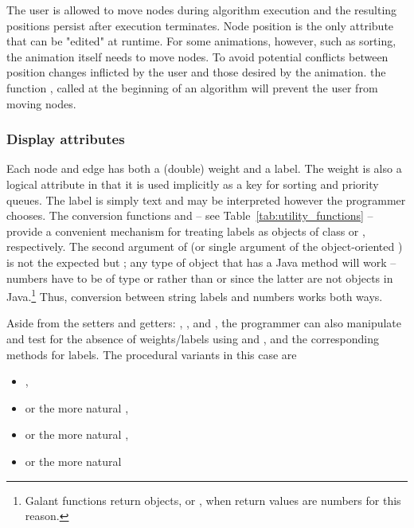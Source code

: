 The user is allowed to move nodes during algorithm execution
and the resulting positions persist after execution terminates.
Node position is the only attribute that can be "edited" at runtime.
For some animations, however, such as sorting,
the animation itself needs to move
nodes.
To avoid potential conflicts between position changes inflicted by the user
and those desired by the animation.
the function , called at the beginning of an algorithm
will prevent the user from moving nodes.

\subsubsection{Display attributes} \label{sec:display_attributes}

Each node and edge has
both a (double) weight and a label.
The weight
is also a logical
attribute in that
it is used implicitly as a
key for
sorting and priority queues.
The label is simply text and may be interpreted however the programmer
chooses.
The conversion functions 
and 
-- see Table~\ref{tab:utility_functions}
-- provide a convenient mechanism for treating labels as objects of class
 or , respectively.
The second argument of  (or single argument of the
object-oriented )
is not the expected 
but ;
any type of object that has a Java  method will work
-- numbers have to be of type  or 
rather than  or  since the latter are not objects
in Java.\footnote{
  Galant functions return objects,  or , when
  return values are numbers for this reason.
}
Thus, conversion between string labels and numbers works both ways.

Aside from the setters and getters: ,
\mbox{}, 
and \mbox{}, the programmer can also
manipulate and test for the absence of weights/labels using
 and ,
and the corresponding methods for labels.
The procedural variants in this case are
\begin{itemize}
  \item {},
  \item \mbox{} or the more natural
    \mbox{},
   \item {} or the more natural
     ,
   \item {} or the more natural
     \mbox{}
\end{itemize}

